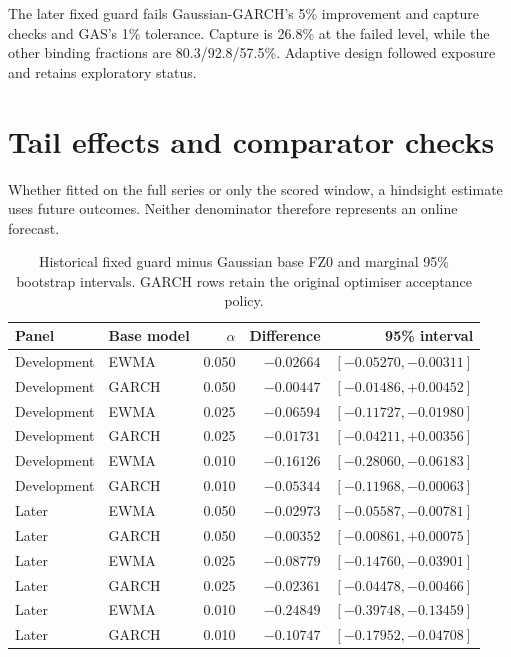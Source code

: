 The later fixed guard fails Gaussian-GARCH's 5\% improvement and capture checks and GAS's 1\% tolerance. Capture is 26.8\% at the failed level, while the other binding fractions are 80.3/92.8/57.5\%. Adaptive design followed exposure and retains exploratory status.

\section{Tail effects and comparator checks}

Whether fitted on the full series or only the scored window, a hindsight estimate uses future outcomes. Neither denominator therefore represents an online forecast.

\begin{table}[htbp]
\centering
\caption[Historical intervals for Gaussian-tail comparisons]{Historical fixed guard minus Gaussian base FZ0 and marginal 95\% bootstrap intervals. GARCH rows retain the original optimiser acceptance policy.}
\label{tab:tail-m1-intervals}
\small
\begin{tabular}{llrrr}
\toprule
Panel & Base model & $\alpha$ & Difference & 95\% interval\\
\midrule
Development & EWMA & 0.050 & $-0.02664$ & $[-0.05270,-0.00311]$\\
Development & GARCH & 0.050 & $-0.00447$ & $[-0.01486,+0.00452]$\\
Development & EWMA & 0.025 & $-0.06594$ & $[-0.11727,-0.01980]$\\
Development & GARCH & 0.025 & $-0.01731$ & $[-0.04211,+0.00356]$\\
Development & EWMA & 0.010 & $-0.16126$ & $[-0.28060,-0.06183]$\\
Development & GARCH & 0.010 & $-0.05344$ & $[-0.11968,-0.00063]$\\
\midrule
Later & EWMA & 0.050 & $-0.02973$ & $[-0.05587,-0.00781]$\\
Later & GARCH & 0.050 & $-0.00352$ & $[-0.00861,+0.00075]$\\
Later & EWMA & 0.025 & $-0.08779$ & $[-0.14760,-0.03901]$\\
Later & GARCH & 0.025 & $-0.02361$ & $[-0.04478,-0.00466]$\\
Later & EWMA & 0.010 & $-0.24849$ & $[-0.39748,-0.13459]$\\
Later & GARCH & 0.010 & $-0.10747$ & $[-0.17952,-0.04708]$\\
\bottomrule
\end{tabular}
\end{table}

